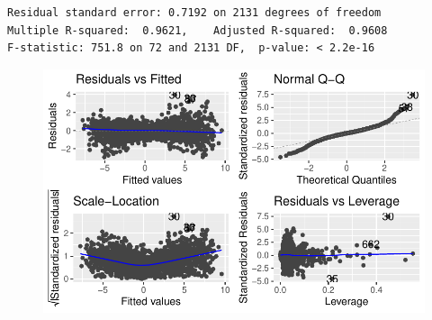 \documentclass[
  letterpaper,
  DIV=11,
  numbers=noendperiod]{scrartcl}
\begin{document}
\begin{verbatim}
Residual standard error: 0.7192 on 2131 degrees of freedom
Multiple R-squared:  0.9621,    Adjusted R-squared:  0.9608 
F-statistic: 751.8 on 72 and 2131 DF,  p-value: < 2.2e-16
\end{verbatim}

\begin{figure}[H]

{\centering \includegraphics{seoul_files/figure-pdf/unnamed-chunk-14-3.pdf}

}

\end{figure}
\end{document}
